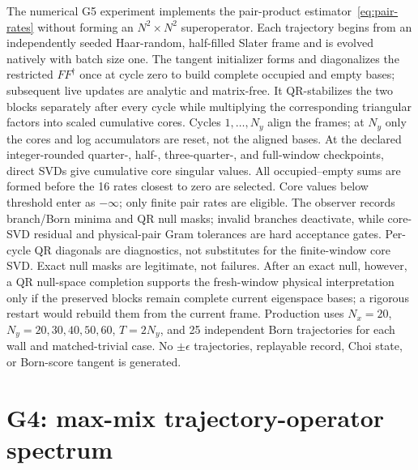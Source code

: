 \documentclass[aps,prx,twocolumn,superscriptaddress,longbibliography,nofootinbib,floatfix]{revtex4-2}
\begin{document}
The numerical G5 experiment implements the pair-product estimator~\eqref{eq:pair-rates} without forming an
$N^2\times N^2$ superoperator.  Each trajectory begins from an independently seeded
Haar-random, half-filled Slater frame and is evolved natively with batch size one.  The
tangent initializer forms and diagonalizes the restricted $FF^\dagger$ once at cycle zero
to build complete occupied and empty bases; subsequent live updates are analytic and
matrix-free.  It QR-stabilizes the two blocks
separately after every cycle while multiplying the corresponding triangular factors into
scaled cumulative cores.  Cycles $1,\ldots,N_y$ align the frames; at $N_y$ only the cores
and log accumulators are reset, not the aligned bases.  At the declared integer-rounded
quarter-, half-, three-quarter-, and full-window checkpoints, direct SVDs give cumulative
core singular values.  All occupied--empty sums are formed before the
16 rates closest to zero are selected.  Core values below threshold enter as $-\infty$;
only finite pair rates are eligible.  The observer records branch/Born minima and QR
null masks; invalid branches deactivate, while core-SVD residual and physical-pair Gram
tolerances are hard acceptance gates.  Per-cycle QR diagonals are diagnostics, not
substitutes for the finite-window core SVD.  Exact null masks are legitimate, not failures.
After an exact null, however, a QR null-space completion supports the fresh-window
physical interpretation only if the preserved blocks remain complete current eigenspace
bases; a rigorous restart would rebuild them from the current frame.
Production uses $N_x=20$, $N_y=20,30,40,50,60$, $T=2N_y$, and 25 independent Born
trajectories for each wall and matched-trivial case.  No $\pm\epsilon$ trajectories,
replayable record, Choi state, or Born-score tangent is generated.

\section{G4: max-mix trajectory-operator spectrum}
\end{document}
